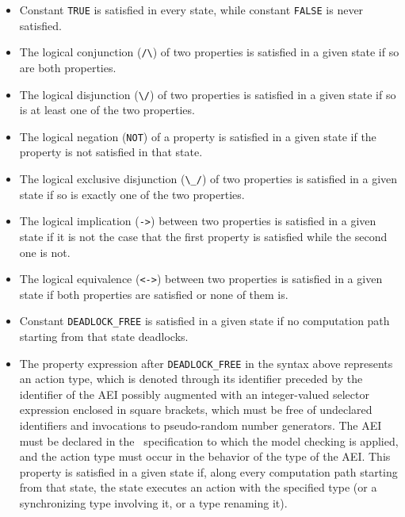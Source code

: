 	\begin{itemize}

\item Constant {\tt TRUE} is satisfied in every state, while constant {\tt FALSE} is never satisfied.

\item The logical conjunction (\verb+/\+) of two properties is satisfied in a given state if so are both
properties.

\item The logical disjunction (\verb+\/+) of two properties is satisfied in a given state if so is at least
one of the two properties.

\item The logical negation ({\tt NOT}) of a property is satisfied in a given state if the property is not
satisfied in that state.

\item The logical exclusive disjunction (\verb+\_/+) of two properties is satisfied in a given state if so
is exactly one of the two properties.

\item The logical implication (\verb+->+) between two properties is satisfied in a given state if it is not
the case that the first property is satisfied while the second one is not.

\item The logical equivalence (\verb+<->+) between two properties is satisfied in a given state if both
properties are satisfied or none of them is.

\item Constant {\tt DEADLOCK\_FREE} is satisfied in a given state if no computation path starting from that
state deadlocks.

\item The property expression after {\tt DEADLOCK\_FREE} in the syntax above represents an action type,
which is denoted through its identifier preceded by the identifier of the AEI possibly augmented with an
integer-valued selector expression enclosed in square brackets, which must be free of undeclared identifiers
and invocations to pseudo-random number generators. The AEI must be declared in the \aemilia\ specification
to which the model checking is applied, and the action type must occur in the behavior of the type of the
AEI. This property is satisfied in a given state if, along every computation path starting from that state,
the state executes an action with the specified type (or a synchronizing type involving it, or a type
renaming it).


\end{itemize}
